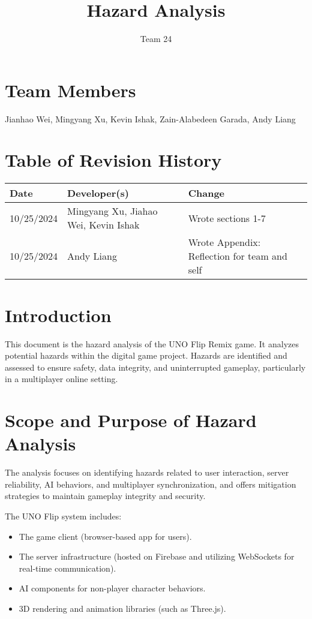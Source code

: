 \documentclass{article}
\title{Hazard Analysis}
\author{Team 24}
\date{}
\begin{document}
\maketitle

\section*{Team Members}
Jianhao Wei, Mingyang Xu, Kevin Ishak, Zain-Alabedeen Garada, Andy Liang

\section*{Table of Revision History}
\begin{longtable}{|l|l|l|}
    \hline
    Date & Developer(s) & Change \\
    \hline
    10/25/2024 & Mingyang Xu, Jiahao Wei, Kevin Ishak & Wrote sections 1-7 \\
    10/25/2024 & Andy Liang & Wrote Appendix: Reflection for team and self \\
    \hline
\end{longtable}

\tableofcontents

\newpage

\section{Introduction}
This document is the hazard analysis of the UNO Flip Remix game. It analyzes potential hazards within the digital game project. Hazards are identified and assessed to ensure safety, data integrity, and uninterrupted gameplay, particularly in a multiplayer online setting.

\section{Scope and Purpose of Hazard Analysis}
The analysis focuses on identifying hazards related to user interaction, server reliability, AI behaviors, and multiplayer synchronization, and offers mitigation strategies to maintain gameplay integrity and security.

The UNO Flip system includes:
\begin{itemize}
    \item The game client (browser-based app for users).
    \item The server infrastructure (hosted on Firebase and utilizing WebSockets for real-time communication).
    \item AI components for non-player character behaviors.
    \item 3D rendering and animation libraries (such as Three.js).
\end{itemize}
\end{document}
